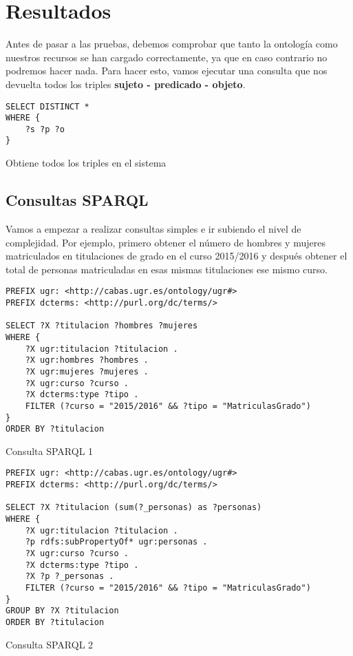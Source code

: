 \chapter{Resultados}

Antes de pasar a las pruebas, debemos comprobar que tanto la ontología como nuestros recursos se han cargado correctamente, ya que en caso contrario no podremos hacer nada. Para hacer esto, vamos ejecutar una consulta que nos devuelta todos los triples {\bf sujeto - predicado - objeto}.

\begin{listing}[!ht]
\begin{verbatim}
SELECT DISTINCT *
WHERE {
	?s ?p ?o
}
\end{verbatim}
\caption{Obtiene todos los triples en el sistema}
\end{listing}

\section{Consultas SPARQL}

Vamos a empezar a realizar consultas simples e ir subiendo el nivel de complejidad. Por ejemplo, primero obtener el número de hombres y mujeres matriculados en titulaciones de grado en el curso 2015/2016 y después obtener el total de personas matriculadas en esas mismas titulaciones ese mismo curso.
\bigskip

\begin{listing}[!ht]
\begin{verbatim}
PREFIX ugr: <http://cabas.ugr.es/ontology/ugr#>
PREFIX dcterms: <http://purl.org/dc/terms/>

SELECT ?X ?titulacion ?hombres ?mujeres 
WHERE {
	?X ugr:titulacion ?titulacion .
	?X ugr:hombres ?hombres .
	?X ugr:mujeres ?mujeres .
	?X ugr:curso ?curso .
	?X dcterms:type ?tipo .
	FILTER (?curso = "2015/2016" && ?tipo = "MatriculasGrado")
}
ORDER BY ?titulacion
\end{verbatim}
\caption{Consulta SPARQL 1}
\end{listing}

\begin{listing}[!ht]
	\begin{verbatim}
PREFIX ugr: <http://cabas.ugr.es/ontology/ugr#>
PREFIX dcterms: <http://purl.org/dc/terms/>

SELECT ?X ?titulacion (sum(?_personas) as ?personas) 
WHERE {
	?X ugr:titulacion ?titulacion .
	?p rdfs:subPropertyOf* ugr:personas .
	?X ugr:curso ?curso .
	?X dcterms:type ?tipo .
	?X ?p ?_personas .
	FILTER (?curso = "2015/2016" && ?tipo = "MatriculasGrado")
}
GROUP BY ?X ?titulacion
ORDER BY ?titulacion
\end{verbatim}
\caption{Consulta SPARQL 2}
\end{listing}

